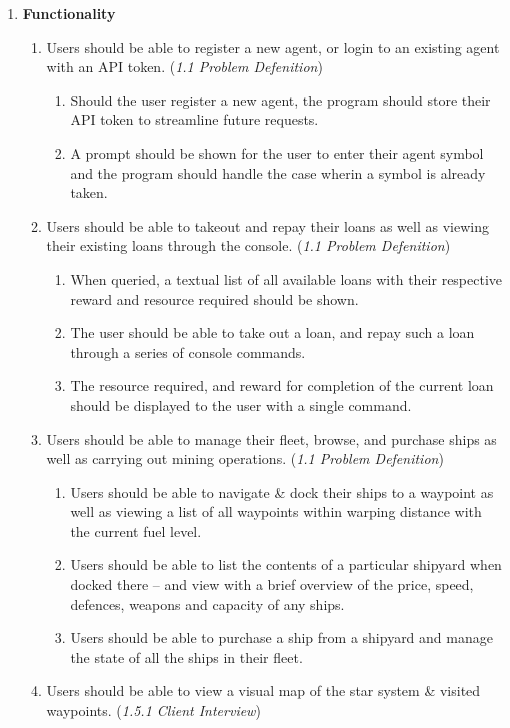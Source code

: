 \begin{enumerate}
    \item \textbf{Functionality}
    \begin{enumerate}
        \item Users should be able to register a new agent, or login to an existing agent with an API token. (\textit{1.1 Problem Defenition})
            \begin{enumerate}
                \item Should the user register a new agent, the program should store their API token to streamline future requests.
                \item A prompt should be shown for the user to enter their agent symbol and the program should handle the case wherin a symbol is already taken.
            \end{enumerate}
        \item Users should be able to takeout and repay their loans as well as viewing their existing loans through the console. (\textit{1.1 Problem Defenition})
            \begin{enumerate}
                \item When queried, a textual list of all available loans with their respective reward and resource required should be shown.
                \item The user should be able to take out a loan, and repay such a loan through a series of console commands. 
                \item The resource required, and reward for completion of the current loan should be displayed to the user with a single command.
            \end{enumerate}
        \item Users should be able to manage their fleet, browse, and purchase ships as well as carrying out mining operations. (\textit{1.1 Problem Defenition})
            \begin{enumerate}
                \item Users should be able to navigate \& dock their ships to a waypoint as well as viewing a list of all waypoints within warping distance with the current fuel level.
                \item Users should be able to list the contents of a particular shipyard when docked there – and view with a brief overview of the price, speed, defences, weapons and capacity of any ships.
                \item Users should be able to purchase a ship from a shipyard and manage the state of all the ships in their fleet.
            \end{enumerate}
        \item Users should be able to view a visual map of the star system \& visited waypoints. (\textit{1.5.1 Client Interview})
    \end{enumerate}
    \end{enumerate}

